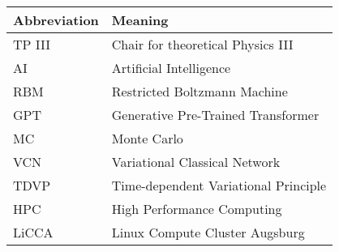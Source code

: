 \noindent\\\\

\begin{tabular}[h]{p{3cm}|l}
	Abbreviation & Meaning\\
	\hline
	TP III & Chair for theoretical Physics III\\
	AI & Artificial Intelligence\\
	RBM & Restricted Boltzmann Machine\\ 
	GPT & Generative Pre-Trained Transformer\\
	MC & Monte Carlo\\
	VCN & Variational Classical Network\\ 
	TDVP & Time-dependent Variational Principle\\ 
	HPC & High Performance Computing\\ 
	LiCCA & Linux Compute Cluster Augsburg\\ 
\end{tabular}\\\\

\newpage